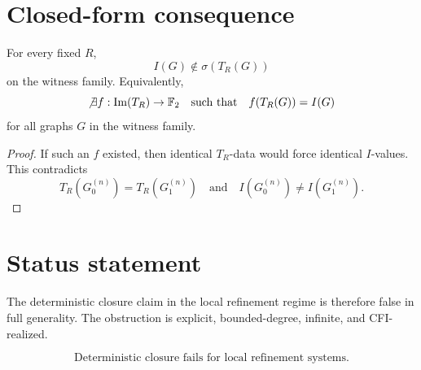 \documentclass[11pt]{article}
\begin{document}
\section{Closed-form consequence}

\begin{corollary}
For every fixed \(R\),
\[
I(G)\notin \sigma(T_R(G))
\]
on the witness family. Equivalently,
\[
\not\exists f:\operatorname{Im}(T_R)\to \mathbb F_2
\quad\text{such that}\quad
f(T_R(G))=I(G)
\]
for all graphs \(G\) in the witness family.
\end{corollary}

\begin{proof}
If such an \(f\) existed, then identical \(T_R\)-data would force identical \(I\)-values. This contradicts
\[
T_R(G_0^{(n)})=T_R(G_1^{(n)})
\quad\text{and}\quad
I(G_0^{(n)})\neq I(G_1^{(n)}).
\]
\end{proof}

\section{Status statement}

The deterministic closure claim in the local refinement regime is therefore false in full generality. The obstruction is explicit, bounded-degree, infinite, and CFI-realized.

\[
\boxed{\text{Deterministic closure fails for local refinement systems.}}
\]
\end{document}
